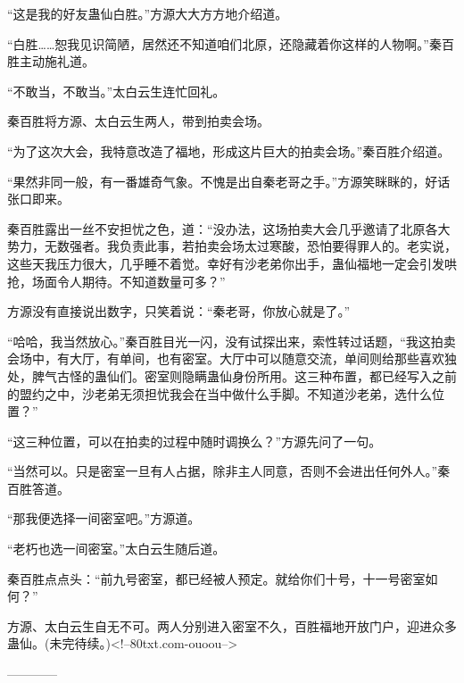 \begin{this_body}
“这是我的好友蛊仙白胜。”方源大大方方地介绍道。

“白胜……恕我见识简陋，居然还不知道咱们北原，还隐藏着你这样的人物啊。”秦百胜主动施礼道。

“不敢当，不敢当。”太白云生连忙回礼。

秦百胜将方源、太白云生两人，带到拍卖会场。

“为了这次大会，我特意改造了福地，形成这片巨大的拍卖会场。”秦百胜介绍道。

“果然非同一般，有一番雄奇气象。不愧是出自秦老哥之手。”方源笑眯眯的，好话张口即来。

秦百胜露出一丝不安担忧之色，道：“没办法，这场拍卖大会几乎邀请了北原各大势力，无数强者。我负责此事，若拍卖会场太过寒酸，恐怕要得罪人的。老实说，这些天我压力很大，几乎睡不着觉。幸好有沙老弟你出手，蛊仙福地一定会引发哄抢，场面令人期待。不知道数量可多？”

方源没有直接说出数字，只笑着说：“秦老哥，你放心就是了。”

“哈哈，我当然放心。”秦百胜目光一闪，没有试探出来，索性转过话题，“我这拍卖会场中，有大厅，有单间，也有密室。大厅中可以随意交流，单间则给那些喜欢独处，脾气古怪的蛊仙们。密室则隐瞒蛊仙身份所用。这三种布置，都已经写入之前的盟约之中，沙老弟无须担忧我会在当中做什么手脚。不知道沙老弟，选什么位置？”

“这三种位置，可以在拍卖的过程中随时调换么？”方源先问了一句。

“当然可以。只是密室一旦有人占据，除非主人同意，否则不会进出任何外人。”秦百胜答道。

“那我便选择一间密室吧。”方源道。

“老朽也选一间密室。”太白云生随后道。

秦百胜点点头：“前九号密室，都已经被人预定。就给你们十号，十一号密室如何？”

方源、太白云生自无不可。两人分别进入密室不久，百胜福地开放门户，迎进众多蛊仙。(未完待续。)<!--80txt.com-ouoou-->

------------

\end{this_body}


